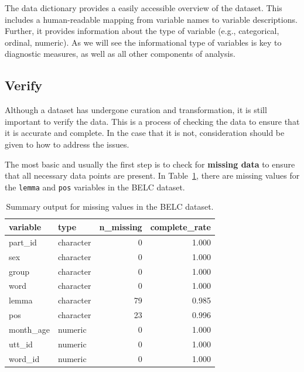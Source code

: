 \documentclass[
  letterpaper,
  DIV=11,
  numbers=noendperiod]{scrreport}
\theoremstyle{definition}
\theoremstyle{remark}
\begin{document}
The data dictionary provides a easily accessible overview of the
dataset. This includes a human-readable mapping from variable names to
variable descriptions. Further, it provides information about the type
of variable (e.g., categorical, ordinal, numeric). As we will see the
informational type of variables is key to diagnostic measures, as well
as all other components of analysis.

\hypertarget{sec-aa-verfiy}{%
\subsection{Verify}\label{sec-aa-verfiy}}

Although a dataset has undergone curation and transformation, it is
still important to verify the data. This is a process of checking the
data to ensure that it is accurate and complete. In the case that it is
not, consideration should be given to how to address the issues.

The most basic and usually the first step is to check for
\textbf{missing data} to ensure that all necessary data points are
present. In Table~\ref{tbl-aa-belc-skim-missing}, there are missing
values for the \texttt{lemma} and \texttt{pos} variables in the BELC
dataset.

\hypertarget{tbl-aa-belc-skim-missing}{}
\begin{table}
\caption{\label{tbl-aa-belc-skim-missing}Summary output for missing values in the BELC dataset. }\tabularnewline

\centering
\begin{tabular}{l|l|r|r}
\hline
variable & type & n\_missing & complete\_rate\\
\hline
part\_id & character & 0 & 1.000\\
\hline
sex & character & 0 & 1.000\\
\hline
group & character & 0 & 1.000\\
\hline
word & character & 0 & 1.000\\
\hline
lemma & character & 79 & 0.985\\
\hline
pos & character & 23 & 0.996\\
\hline
month\_age & numeric & 0 & 1.000\\
\hline
utt\_id & numeric & 0 & 1.000\\
\hline
word\_id & numeric & 0 & 1.000\\
\hline
\end{tabular}
\end{table}
\end{document}
